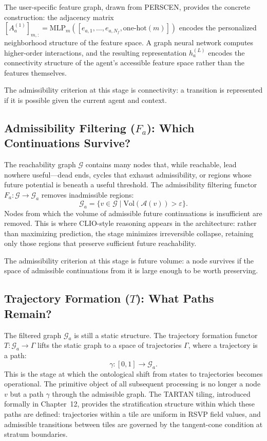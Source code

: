 \documentclass[12pt, oneside]{book}
\theoremstyle{flyxion}
\theoremstyle{definition}
\begin{document}
The user-specific feature graph, drawn from PERSCEN, provides the
concrete construction: the adjacency matrix $[A_a^{(1)}]_{m,:} =
\mathrm{MLP}_m([e_{a,1}, \ldots, e_{a,N_f}, \mathrm{one\text{-}hot}(m)])$
encodes the personalized neighborhood structure of the feature space.
A graph neural network computes higher-order interactions, and the
resulting representation $h_a^{(L)}$ encodes the connectivity structure
of the agent's accessible feature space rather than the features
themselves.

The admissibility criterion at this stage is connectivity: a transition
is represented if it is possible given the current agent and context.

\subsection{Admissibility Filtering ($F_a$):
            Which Continuations Survive?}

The reachability graph $\mathcal{G}$ contains many nodes that, while
reachable, lead nowhere useful---dead ends, cycles that exhaust
admissibility, or regions whose future potential is beneath a useful
threshold. The admissibility filtering functor
$F_a : \mathcal{G} \to \mathcal{G}_a$ removes inadmissible regions:
\[
\mathcal{G}_a = \bigl\{v \in \mathcal{G} \mid
\mathrm{Vol}(\mathcal{A}(v)) > \varepsilon\bigr\}.
\]
Nodes from which the volume of admissible future continuations is
insufficient are removed. This is where CLIO-style reasoning appears
in the architecture: rather than maximizing prediction, the stage
minimizes irreversible collapse, retaining only those regions that
preserve sufficient future reachability.

The admissibility criterion at this stage is future volume: a node
survives if the space of admissible continuations from it is large
enough to be worth preserving.

\subsection{Trajectory Formation ($T$): What Paths Remain?}

The filtered graph $\mathcal{G}_a$ is still a static structure. The
trajectory formation functor $T : \mathcal{G}_a \to \Gamma$ lifts
the static graph to a space of trajectories $\Gamma$, where a
trajectory is a path:
\[
\gamma : [0,1] \to \mathcal{G}_a.
\]
This is the stage at which the ontological shift from states to
trajectories becomes operational. The primitive object of all subsequent
processing is no longer a node $v$ but a path $\gamma$ through the
admissible graph. The TARTAN tiling, introduced formally in Chapter~12,
provides the stratification structure within which these paths are
defined: trajectories within a tile are uniform in RSVP field values,
and admissible transitions between tiles are governed by the
tangent-cone condition at stratum boundaries.
\end{document}

